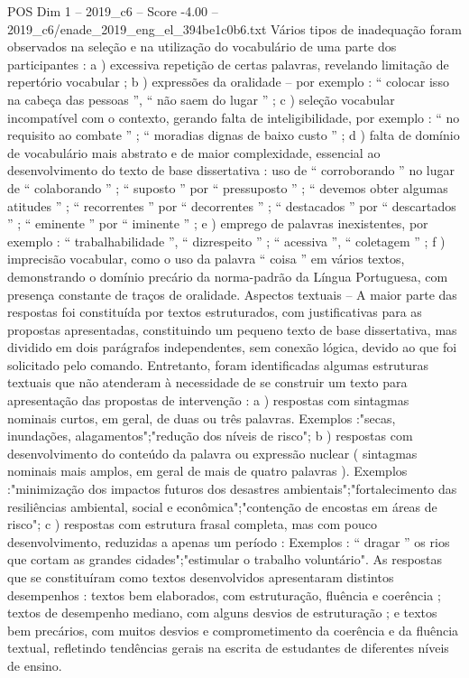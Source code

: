 \begin{textsample}{POS Dim 1 – 2019\_c6 – Score -4.00 – 2019\_c6/enade\_2019\_eng\_el\_394be1c0b6.txt}
Vários tipos de inadequação foram observados na seleção e na utilização do vocabulário de uma parte dos participantes : a ) excessiva repetição de certas palavras, revelando limitação de repertório vocabular ; b ) expressões da oralidade – por exemplo : “ colocar isso na cabeça das pessoas ”, “ não saem do lugar ” ; c ) seleção vocabular incompatível com o contexto, gerando falta de inteligibilidade, por exemplo : “ no requisito ao combate ” ; “ moradias dignas de baixo custo ” ; d ) falta de domínio de vocabulário mais abstrato e de maior complexidade, essencial ao desenvolvimento do texto de base dissertativa : uso de “ corroborando ” no lugar de “ colaborando ” ; “ suposto ” por “ pressuposto ” ; “ devemos obter algumas atitudes ” ; “ recorrentes ” por “ decorrentes ” ; “ destacados ” por “ descartados ” ; “ eminente ” por “ iminente ” ; e ) emprego de palavras inexistentes, por exemplo : “ trabalhabilidade ”, “ dizrespeito ” ; “ acessiva ”, “ coletagem ” ; f ) imprecisão vocabular, como o uso da palavra “ coisa ” em vários textos, demonstrando o domínio precário da norma-padrão da Língua Portuguesa, com presença constante de traços de oralidade.
Aspectos textuais – A maior parte das respostas foi constituída por textos estruturados, com justificativas para as propostas apresentadas, constituindo um pequeno texto de base dissertativa, mas dividido em dois parágrafos independentes, sem conexão lógica, devido ao que foi solicitado pelo comando.
Entretanto, foram identificadas algumas estruturas textuais que não atenderam à necessidade de se construir um texto para apresentação das propostas de intervenção : a ) respostas com sintagmas nominais curtos, em geral, de duas ou três palavras.
Exemplos :"secas, inundações, alagamentos";"redução dos níveis de risco"; b ) respostas com desenvolvimento do conteúdo da palavra ou expressão nuclear ( sintagmas nominais mais amplos, em geral de mais de quatro palavras ).
Exemplos :"minimização dos impactos futuros dos desastres ambientais";"fortalecimento das resiliências ambiental, social e econômica";"contenção de encostas em áreas de risco"; c ) respostas com estrutura frasal completa, mas com pouco desenvolvimento, reduzidas a apenas um período : Exemplos : “ dragar ” os rios que cortam as grandes cidades";"estimular o trabalho voluntário".
As respostas que se constituíram como textos desenvolvidos apresentaram distintos desempenhos : textos bem elaborados, com estruturação, fluência e coerência ; textos de desempenho mediano, com alguns desvios de estruturação ; e textos bem precários, com muitos desvios e comprometimento da coerência e da fluência textual, refletindo tendências gerais na escrita de estudantes de diferentes níveis de ensino.

\end{textsample}
